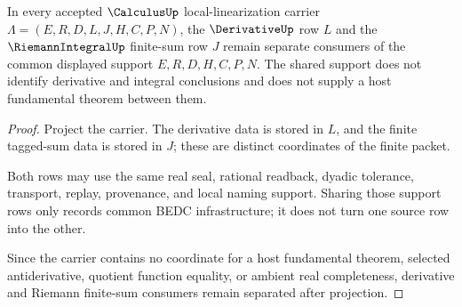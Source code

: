 \begin{theorem}
\label{thm:calculus-riemann-derivative-separation}
In every accepted $\CalculusUp$ local-linearization carrier $\Lambda=(E,R,D,L,J,H,C,P,N)$, the $\DerivativeUp$ row $L$ and the $\RiemannIntegralUp$ finite-sum row $J$ remain separate consumers of the common displayed support $E,R,D,H,C,P,N$. The shared support does not identify derivative and integral conclusions and does not supply a host fundamental theorem between them.
\end{theorem}
\begin{proof}
Project the carrier. The derivative data is stored in $L$, and the finite tagged-sum data is stored in $J$; these are distinct coordinates of the finite packet.

Both rows may use the same real seal, rational readback, dyadic tolerance, transport, replay, provenance, and local naming support. Sharing those support rows only records common BEDC infrastructure; it does not turn one source row into the other.

Since the carrier contains no coordinate for a host fundamental theorem, selected antiderivative, quotient function equality, or ambient real completeness, derivative and Riemann finite-sum consumers remain separated after projection.
\end{proof}

